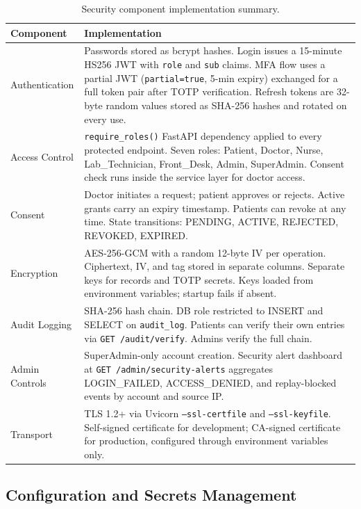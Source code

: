 \documentclass[11pt,a4paper]{article}
\begin{document}
\begin{table}[H]
\centering
\small
\setlength{\tabcolsep}{5pt}
\begin{tabular}{p{3cm}p{9.5cm}}
\toprule
\textbf{Component} & \textbf{Implementation} \\
\midrule
Authentication &
  Passwords stored as bcrypt hashes. Login issues a 15-minute HS256 JWT
  with \texttt{role} and \texttt{sub} claims. MFA flow uses a partial JWT
  (\texttt{partial=true}, 5-min expiry) exchanged for a full token pair
  after TOTP verification. Refresh tokens are 32-byte random values stored
  as SHA-256 hashes and rotated on every use. \\
\addlinespace
Access Control &
  \texttt{require\_roles()} FastAPI dependency applied to every protected
  endpoint. Seven roles: Patient, Doctor, Nurse, Lab\_Technician,
  Front\_Desk, Admin, SuperAdmin. Consent check runs inside the service
  layer for doctor access. \\
\addlinespace
Consent &
  Doctor initiates a request; patient approves or rejects. Active grants
  carry an expiry timestamp. Patients can revoke at any time. State
  transitions: PENDING, ACTIVE, REJECTED, REVOKED, EXPIRED. \\
\addlinespace
Encryption &
  AES-256-GCM with a random 12-byte IV per operation. Ciphertext, IV, and
  tag stored in separate columns. Separate keys for records and TOTP
  secrets. Keys loaded from environment variables; startup fails if absent. \\
\addlinespace
Audit Logging &
  SHA-256 hash chain. DB role restricted to INSERT and SELECT on
  \texttt{audit\_log}. Patients can verify their own entries via
  \texttt{GET /audit/verify}. Admins verify the full chain. \\
\addlinespace
Admin Controls &
  SuperAdmin-only account creation. Security alert dashboard at
  \texttt{GET /admin/security-alerts} aggregates LOGIN\_FAILED,
  ACCESS\_DENIED, and replay-blocked events by account and source IP. \\
\addlinespace
Transport &
  TLS 1.2+ via Uvicorn \texttt{--ssl-certfile} and \texttt{--ssl-keyfile}.
  Self-signed certificate for development; CA-signed certificate for
  production, configured through environment variables only. \\
\bottomrule
\end{tabular}
\caption{Security component implementation summary.}
\label{tab:impl}
\end{table}

\subsection{Configuration and Secrets Management}
\end{document}
